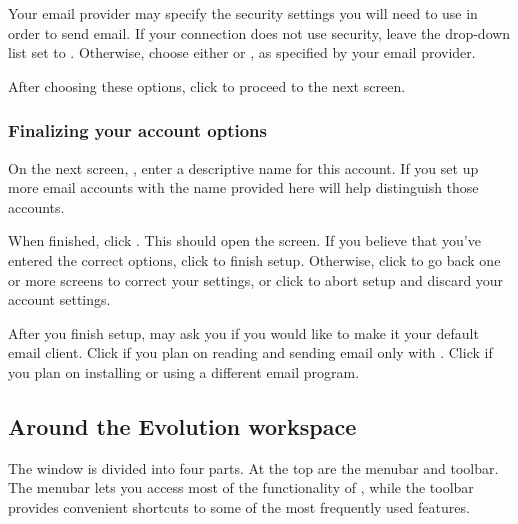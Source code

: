 Your email provider may specify the security settings you will need to use
in order to send email. If your connection does not use security, leave
the  drop-down list set to .
Otherwise, choose either  or , as specified by your email provider.

After choosing these options, click  to proceed to the 
next screen.

\subsubsection{Finalizing your account options}

On the next screen, , enter a descriptive
name for this account. If you set up more email accounts with  the name provided here will help distinguish those accounts.

When finished, click . This should open the
 screen. If you believe that you've entered the correct options,
click  to finish setup. Otherwise, click 
 to go back one or more screens to correct your settings,
or click  to abort setup and discard your account 
settings. 

After you finish setup,  may ask you if you would like to
make it your default email client. Click  if you 
plan on reading and sending email only with . Click  
if you plan on installing or using a different email program.

\subsection{Around the Evolution workspace}


\vspace{10 mm}

The  window is divided into four parts. At the top are the 
menubar and toolbar. The menubar lets you access most of the functionality
of , while the toolbar provides convenient shortcuts to some of
the most frequently used features.

